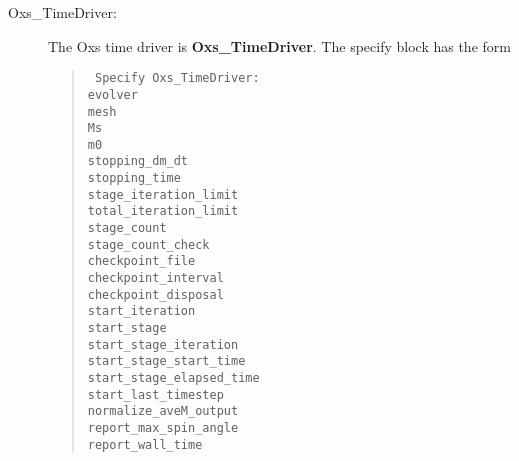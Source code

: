 \begin{description}
%
\item[Oxs\_TimeDriver:\label{item:TimeDriver}]
The Oxs time driver is \textbf{Oxs\_TimeDriver}.  The specify block has
the form
\begin{latexonly}
\begin{quote}\tt
Specify Oxs\_TimeDriver: \ocb\\
 \bi evolver \\
 \bi mesh \\
 \bi Ms \\
 \bi m0 \\
 \bi stopping\_dm\_dt \\
 \bi stopping\_time \\
 \bi stage\_iteration\_limit \\
 \bi total\_iteration\_limit \\
 \bi stage\_count \\
 \bi stage\_count\_check \\
 \bi checkpoint\_file \\
 \bi checkpoint\_interval \\
 \bi checkpoint\_disposal \\
 \bi start\_iteration \\
 \bi start\_stage \\
 \bi start\_stage\_iteration \\
 \bi start\_stage\_start\_time \\
 \bi start\_stage\_elapsed\_time \\
 \bi start\_last\_timestep \\
 \bi normalize\_aveM\_output \\
 \bi report\_max\_spin\_angle \\
 \bi report\_wall\_time \\
\ccb
\end{quote}
\end{latexonly}
\begin{rawhtml}

\end{rawhtml}
\end{description}
